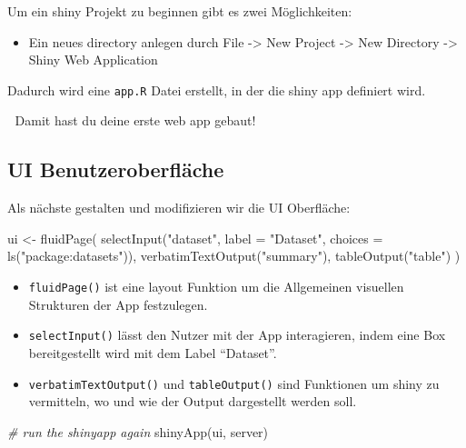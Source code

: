 \documentclass[
]{article}
\newenvironment{Shaded}{\begin{snugshade}}{\end{snugshade}}
\newcommand{\AttributeTok}[1]{\textcolor[rgb]{0.77,0.63,0.00}{#1}}
\newcommand{\CommentTok}[1]{\textcolor[rgb]{0.56,0.35,0.01}{\textit{#1}}}
\newcommand{\FunctionTok}[1]{\textcolor[rgb]{0.00,0.00,0.00}{#1}}
\newcommand{\NormalTok}[1]{#1}
\newcommand{\OtherTok}[1]{\textcolor[rgb]{0.56,0.35,0.01}{#1}}
\newcommand{\StringTok}[1]{\textcolor[rgb]{0.31,0.60,0.02}{#1}}
\providecommand{\tightlist}{%
  \setlength{\itemsep}{0pt}\setlength{\parskip}{0pt}}
\begin{document}
Um ein shiny Projekt zu beginnen gibt es zwei Möglichkeiten:

\begin{itemize}
\tightlist
\item
  Ein neues directory anlegen durch File -\textgreater{} New Project -\textgreater{} New Directory -\textgreater{} Shiny Web Application
\end{itemize}

Dadurch wird eine \texttt{app.R} Datei erstellt, in der die shiny app definiert wird.

🎉 Damit hast du deine erste web app gebaut!

\hypertarget{ui-benutzeroberfluxe4che}{%
\subsection{UI Benutzeroberfläche}\label{ui-benutzeroberfluxe4che}}

Als nächste gestalten und modifizieren wir die UI Oberfläche:

\begin{Shaded}
\begin{Highlighting}[]
\NormalTok{ui }\OtherTok{\textless{}{-}} \FunctionTok{fluidPage}\NormalTok{(}
  \FunctionTok{selectInput}\NormalTok{(}\StringTok{"dataset"}\NormalTok{, }\AttributeTok{label =} \StringTok{"Dataset"}\NormalTok{, }\AttributeTok{choices =} \FunctionTok{ls}\NormalTok{(}\StringTok{"package:datasets"}\NormalTok{)),}
  \FunctionTok{verbatimTextOutput}\NormalTok{(}\StringTok{"summary"}\NormalTok{),}
  \FunctionTok{tableOutput}\NormalTok{(}\StringTok{"table"}\NormalTok{)}
\NormalTok{)}
\end{Highlighting}
\end{Shaded}

\begin{itemize}
\tightlist
\item
  \texttt{fluidPage()} ist eine layout Funktion um die Allgemeinen visuellen Strukturen der App festzulegen.
\item
  \texttt{selectInput()} lässt den Nutzer mit der App interagieren, indem eine Box bereitgestellt wird mit dem Label ``Dataset''.
\item
  \texttt{verbatimTextOutput()} und \texttt{tableOutput()} sind Funktionen um shiny zu vermitteln, wo und wie der Output dargestellt werden soll.
\end{itemize}

\begin{Shaded}
\begin{Highlighting}[]
\CommentTok{\# run the shinyapp again}
\FunctionTok{shinyApp}\NormalTok{(ui, server)}
\end{Highlighting}
\end{Shaded}
\end{document}
